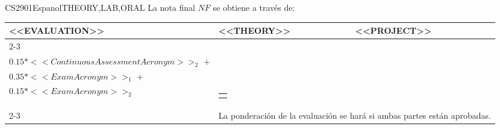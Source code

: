   \begin{evaluation}{CS2901}{Espanol}{THEORY,LAB,ORAL}
  La nota final $NF$ se obtiene a través de:
 
  \begin{tabularx}{0.9\textwidth}{|X|p{}|p{}|} \hline
  \multirow{4}{*}{\uppercase{<<Evaluation>>}} & \uppercase{<<Theory>>} & \uppercase{<<Project>>} \\ \cline{2-3}
  & %
      \begin{minipage}{0.95\textwidth}
      \begin{tabular}{l}
        $0.15*<<ContinuousAssessmentAcronym>>_{1}$ + \\
        $0.15*<<ContinuousAssessmentAcronym>>_{2}$ + \\
        $0.35*<<ExamAcronym>>_{1}$ + \\
        $0.15*<<ExamAcronym>>_{2}$
      \end{tabular} 
      \end{minipage} 
  & %
      \begin{minipage}{0.95\textwidth}
      \begin{tabular}{l}
          $0.2(A + D) + 0.3(Dev) + 0.3(DF)$
          \end{tabular} 
      \end{minipage}                 \\ \cline{2-3}
  
      & \multicolumn{2}{|c|}{La ponderación de la evaluación se hará si ambas partes están aprobadas.}  \\ \hline
  \end{tabularx}
  

\end{evaluation}
